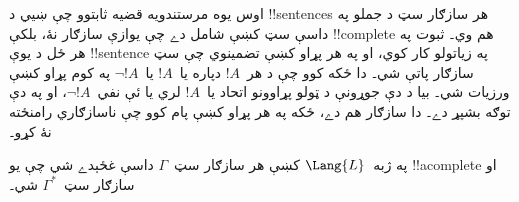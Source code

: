 \documentclass[../../../include/open-logic-section]{subfiles}
\begin{document}
      {}
      {}


\begin{explain}
اوس يوه مرستندويه قضيه ثابتوو چې ښيي د !!{sentence}s هر سازګار
سټ د جملو په داسې سټ کښې شامل دے چې يوازې سازګار نۀ، بلکې
!!{complete} هم وي۔ ثبوت په هر ځل د يوې !!{sentence} په زياتولو
کار کوي، او په هر پړاو کښې تضمينوي چې سټ سازګار پاتې شي۔ دا ځکه
کوو چې د هر~$!A$ دپاره يا~$!A$ يا~$\lnot !A$ په کوم پړاو کښې
ورزيات شي۔ بيا د دې جوړونې د ټولو پړاوونو اتحاد يا~$!A$ لري يا
ئې نفي~$\lnot !A$، او په دې توګه بشپړ دے۔ دا سازګار هم دے، ځکه
په هر پړاو کښې پام کوو چې ناسازګاري رامنځته نۀ کړو۔
\end{explain}

\begin{lem}
 په ژبه~$\Lang{L}$ کښې هر سازګار
سټ~$\Gamma$ داسې غځېدے شي چې يو !!a{complete} او سازګار
سټ~$\Gamma^*$ شي۔
\end{lem}
\end{document}
